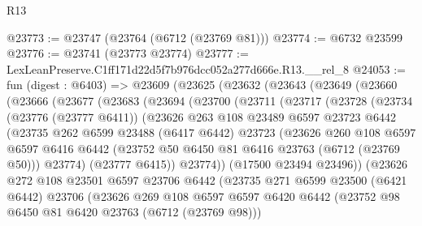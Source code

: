 \begin{lexlean}{R13}
\begin{coremodule}
@23773 := @23747 (@23764 (@6712 (@23769 @81)))
@23774 := @6732 @23599
@23776 := @23741 (@23773 @23774)
@23777 := LexLeanPreserve.C1ff171d22d5f7b976dcc052a277d666e.R13.__rel_8
@24053 := fun (digest : @6403) =>
  @23609
    (@23625
      (@23632
        (@23643
          (@23649
            (@23660
              (@23666
                (@23677
                  (@23683
                    (@23694
                      (@23700
                        (@23711
                          (@23717
                            (@23728
                              (@23734
                                (@23776 (@23777 @6411))
                                (@23626
                                  @263
                                  @108
                                  @23489
                                  @6597
                                  @23723
                                  @6442
                                  (@23735
                                    @262
                                    @6599
                                    @23488
                                    (@6417 @6442)
                                    @23723
                                    (@23626
                                      @260
                                      @108
                                      @6597
                                      @6597
                                      @6416
                                      @6442
                                      (@23752 @50 @6450 @81 @6416 @23763 (@6712 (@23769 @50)))
                                      @23774)
                                    (@23777 @6415))
                                  @23774))
                              (@17500 @23494 @23496))
                            (@23626
                              @272
                              @108
                              @23501
                              @6597
                              @23706
                              @6442
                              (@23735
                                @271
                                @6599
                                @23500
                                (@6421 @6442)
                                @23706
                                (@23626
                                  @269
                                  @108
                                  @6597
                                  @6597
                                  @6420
                                  @6442
                                  (@23752 @98 @6450 @81 @6420 @23763 (@6712 (@23769 @98)))

\end{coremodule}
\end{lexlean}
